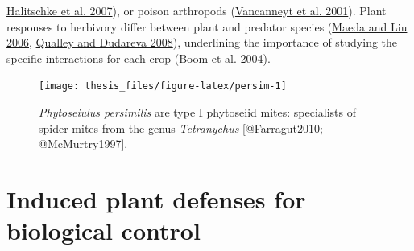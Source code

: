 \documentclass[12pt,final,CPage]{ufthesis}
\begin{document}
{\protect\hyperlink{ref-Halitschke2007}{Halitschke et al. 2007}), or poison arthropods (\protect\hyperlink{ref-Vancanneyt2001}{Vancanneyt et al. 2001}). Plant responses to herbivory differ between plant and predator species (\protect\hyperlink{ref-Maeda2006}{Maeda and Liu 2006}, \protect\hyperlink{ref-Qualley2008}{Qualley and Dudareva 2008}), underlining the importance of studying the specific interactions for each crop (\protect\hyperlink{ref-Boom2004}{Boom et al. 2004}).
  \begin{figure}

  {\centering \texttt{[image: thesis\_files/figure-latex/persim-1]} 

  }

  \caption{\textit{Phytoseiulus persimilis} are type I phytoseiid mites: specialists of spider mites from the genus \textit{Tetranychus} [@Farragut2010; @McMurtry1997].}\label{fig:persim}
  \end{figure}
  \hypertarget{litrev-plantdef}{%
  \section{Induced plant defenses for biological control}\label{litrev-plantdef}}

}
\end{document}

